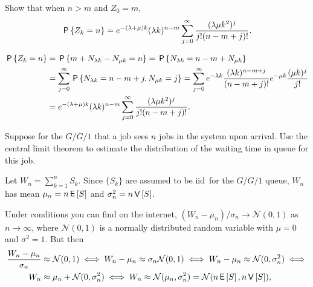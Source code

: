 \begin{exercise}\label{ex:l-134}
 Show
that when $n>m$ and $Z_0=m$,
\begin{equation*}
 \P{Z_k=n}
= e^{-(\lambda+\mu)k} (\lambda k)^{n-m} \sum_{j=0}^\infty
\frac{(\lambda\mu k^2)^j} {j!(n-m+j)!}.
\end{equation*}
\begin{solution}
\begin{align*}
 \P{Z_k=n}
&= \P{m+N_{\lambda k } - N_{\mu k} = n }
= \P{N_{\lambda k} = n - m + N_{\mu k}} \\
&= \sum_{j=0}^\infty \P{N_{\lambda k}  =  n - m + j, N_{\mu k} =j}
= \sum_{j=0}^\infty e^{-\lambda k} \frac{(\lambda k )^{n - m + j}}{(n-m+j)!} e^{-\mu k} \frac{(\mu k )^j}{j!} \\
&= e^{-(\lambda+\mu)k} (\lambda k)^{n-m} \sum_{j=0}^\infty  \frac{(\lambda\mu k^2)^j} {j!(n-m+j)!}.
\end{align*}
\end{solution}
\end{exercise}




\begin{exercise}\label{ex:l-147}
 Suppose
 for the $G/G/1$ that a job sees $n$ jobs in the system upon arrival.
 Use the central limit theorem to estimate the distribution of the waiting time in queue for this job.
\begin{hint}
 Let $W_{n} = \sum_{k=1}^n S_k$.
 Since $\{S_k\}$ are assumed to be iid\ for the $G/G/1$ queue, $W_{n}$ has mean $\mu_n = n \E S$ and $\sigma_n^2 = n\V S$.
\end{hint}
\begin{solution} Under conditions you can find on the internet, $(W_{n} - \mu_n)/\sigma_n \to \mathcal{N}(0,1)$ as $n\to \infty$,
 where $\mathcal{N}(0,1)$ is a normally distributed random variable
 with $\mu=0$ and $\sigma^2=1$. But then
 \begin{align*}
 \frac{\W_{n} - \mu_n}{\sigma_n} &\approx \mathcal{N}(0,1) \iff  W_{n} - \mu_n \approx \sigma_n \mathcal{N}(0,1) \iff
 W_{n} - \mu_n \approx \mathcal{N}(0,\sigma_n^2) \iff \\
 W_{n} &\approx \mu_n + \mathcal{N}(0,\sigma_n^2) \iff
 W_{n} \approx \mathcal{N}(\mu_n,\sigma_n^2) = \mathcal{N}(n\E S, n \V S),
 \end{align*}
\end{solution}
\end{exercise}




